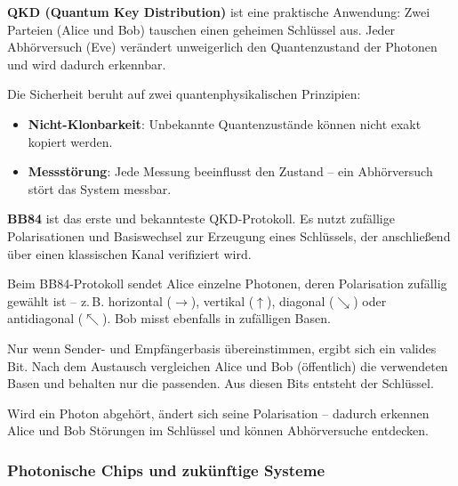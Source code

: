 \textbf{QKD (Quantum Key Distribution)} ist eine praktische Anwendung: Zwei Parteien (Alice und Bob) tauschen einen geheimen Schlüssel aus. Jeder Abhörversuch (Eve) verändert unweigerlich den Quantenzustand der Photonen und wird dadurch erkennbar.

\begin{tcolorbox}[didaktikbox, title=Was macht QKD sicher?] 
	\label{box:qkd}
	\small
	Die Sicherheit beruht auf zwei quantenphysikalischen Prinzipien:
	\begin{itemize}
		\item \textbf{Nicht-Klonbarkeit}: Unbekannte Quantenzustände können nicht exakt kopiert werden.
		\item \textbf{Messstörung}: Jede Messung beeinflusst den Zustand – ein Abhörversuch stört das System messbar.
	\end{itemize}
\end{tcolorbox}

\textbf{BB84} ist das erste und bekannteste QKD-Protokoll. Es nutzt zufällige Polarisationen und Basiswechsel zur Erzeugung eines Schlüssels, der anschließend über einen klassischen Kanal verifiziert wird.

\medskip
\begin{tcolorbox}[didaktikbox, title=Wie funktioniert QKD (z.\,B. BB84)?] 
	\label{box:wie funktioniert QKD}
	\small
	Beim BB84-Protokoll sendet Alice einzelne Photonen, deren Polarisation zufällig gewählt ist – z.\,B. horizontal ($\rightarrow$), vertikal ($\uparrow$), diagonal ($\searrow$) oder antidiagonal ($\nwarrow$). Bob misst ebenfalls in zufälligen Basen.
	
	Nur wenn Sender- und Empfängerbasis übereinstimmen, ergibt sich ein valides Bit. Nach dem Austausch vergleichen Alice und Bob (öffentlich) die verwendeten Basen und behalten nur die passenden. Aus diesen Bits entsteht der Schlüssel.
	
	Wird ein Photon abgehört, ändert sich seine Polarisation – dadurch erkennen Alice und Bob Störungen im Schlüssel und können Abhörversuche entdecken.
\end{tcolorbox}

\subsubsection{Photonische Chips und zukünftige Systeme}


